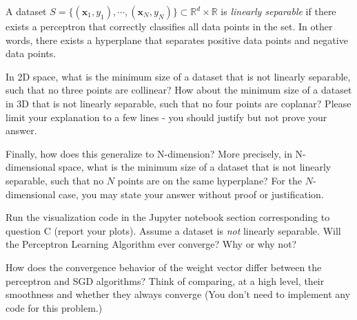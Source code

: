 \begin{problem}[4]
  A dataset $S = \{(\mathbf{x}_1, y_1),\cdots,(\mathbf{x}_N, y_N)\} \subset \mathbb{R}^d \times \mathbb{R}$ is \emph{linearly separable} if there exists a perceptron that correctly classifies all data points in the set. In other words, there exists a hyperplane that separates positive data points and negative data points.

  In 2D space, what is the minimum size of a dataset that is not linearly separable, such that no three points are collinear? How about the minimum size of a dataset in 3D that is not linearly separable, such that no four points are coplanar? Please limit your explanation to a few lines - you should justify but not prove your answer.

  Finally, how does this generalize to N-dimension? More precisely, in N-dimensional space, what is the minimum size of a dataset that is not linearly separable, such that no $N$ points are on the same hyperplane? For the $N$-dimensional case, you may state your answer without proof or justification.
\end{problem}
\begin{solution}
  
\end{solution}

\begin{problem}[2]
  Run the visualization code in the Jupyter notebook section corresponding to question C (report your plots). Assume a dataset is \emph{not} linearly separable. Will the Perceptron Learning Algorithm ever converge? Why or why not?
\end{problem}
\begin{solution}

\end{solution}

\begin{problem}[2]
How does the convergence behavior of the weight vector differ between the perceptron and SGD algorithms? Think of comparing, at a high level, their smoothness and whether they always converge (You don't need to implement any code for this problem.)
\end{problem}
\begin{solution}
\end{solution}
